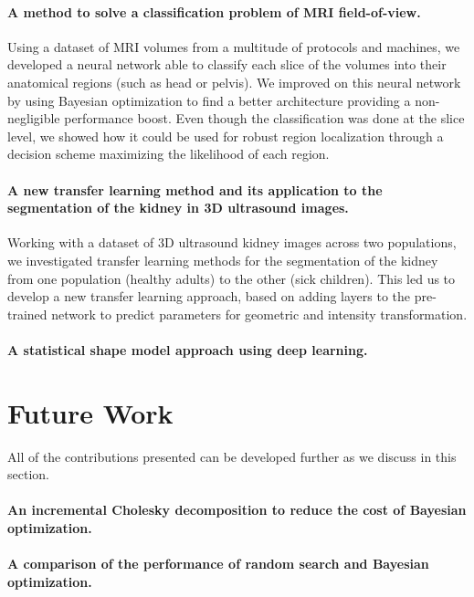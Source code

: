 \paragraph*{A method to solve a classification problem of MRI field-of-view.}
Using a dataset of MRI volumes from a multitude of protocols and machines, we developed a neural network able to classify each slice of the volumes into their anatomical regions (such as head or pelvis). We improved on this neural network by using Bayesian optimization to find a better architecture providing a non-negligible performance boost. Even though the classification was done at the slice level, we showed how it could be used for robust region localization through a decision scheme maximizing the likelihood of each region.

\paragraph*{A new transfer learning method and its application to the segmentation of the kidney in 3D ultrasound images.}
Working with a dataset of 3D ultrasound kidney images across two populations, we investigated transfer learning methods for the segmentation of the kidney from one population (healthy adults) to the other (sick children). This led us to develop a new transfer learning approach, based on adding layers to the pre-trained network to predict parameters for geometric and intensity transformation. 

\paragraph*{A statistical shape model approach using deep learning.}

\section{Future Work}

All of the contributions presented can be developed further as we discuss in this section.

\paragraph*{An incremental Cholesky decomposition to reduce the cost of Bayesian optimization.}


\paragraph*{A comparison of the performance of random search and Bayesian optimization.} 


